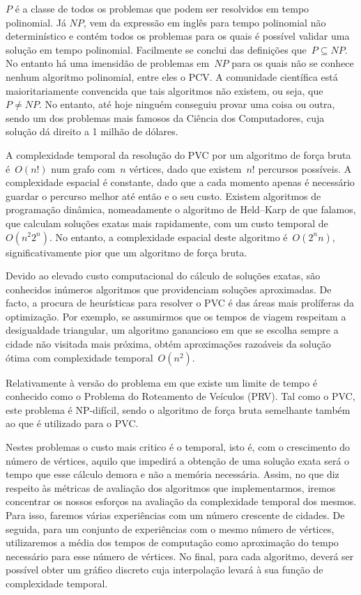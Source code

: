 \documentclass[12pt,a4paper,reqno]{report}
\numberwithin{figure}{section}
\numberwithin{equation}{section}
\begin{document}
$P$ é a classe de todos os problemas que podem ser resolvidos em tempo polinomial. Já $NP$, vem da expressão em inglês para tempo polinomial não determinístico e contém todos os problemas para os quais é possível validar uma solução em tempo polinomial. Facilmente se conclui das definições que~$P \subseteq NP$. No entanto há uma imensidão de problemas em~$NP$ para os quais não se conhece nenhum algoritmo polinomial, entre eles o PCV. A comunidade científica está maioritariamente convencida que tais algoritmos não existem, ou seja, que~$P \neq NP$. No entanto, até hoje ninguém conseguiu provar uma coisa ou outra, sendo um dos problemas mais famosos da Ciência dos Computadores, cuja solução dá direito a 1 milhão de dólares.

A complexidade temporal da resolução do PVC por um algoritmo de força bruta é~$O(n!)$ num grafo com~$n$ vértices, dado que existem~$n!$ percursos possíveis. A complexidade espacial é constante, dado que a cada momento apenas é necessário guardar o percurso melhor até então e o seu custo. Existem algoritmos de programação dinâmica, nomeadamente o algoritmo de Held–Karp de que falamos, que calculam soluções exatas mais rapidamente, com um custo temporal de~$O(n^2 2^n)$. No entanto, a complexidade espacial deste algoritmo é~$O(2^n n)$, significativamente pior que um algoritmo de força bruta.

Devido ao elevado custo computacional do cálculo de soluções exatas, são conhecidos inúmeros algoritmos que providenciam soluções aproximadas. De facto, a procura de heurísticas para resolver o PVC é das áreas mais prolíferas da optimização. Por exemplo, se assumirmos que os tempos de viagem respeitam a desigualdade triangular, um algoritmo ganancioso em que se escolha sempre a cidade não visitada mais próxima, obtém aproximações razoáveis da solução ótima com complexidade temporal~$O(n^2)$.

Relativamente à versão do problema em que existe um limite de tempo é conhecido como o Problema do Roteamento de Veículos (PRV). Tal como o PVC, este problema é NP-difícil, sendo o algoritmo de força bruta semelhante também ao que é utilizado para o PVC.

Nestes problemas o custo mais critico é o temporal, isto é, com o crescimento do número de vértices, aquilo que impedirá a obtenção de uma solução exata será o tempo que esse cálculo demora e não a memória necessária. Assim, no que diz respeito às métricas de avaliação dos algoritmos que implementarmos, iremos concentrar os nossos esforços na avaliação da complexidade temporal dos mesmos. Para isso, faremos várias experiências com um número crescente de cidades. De seguida, para um conjunto de experiências com o mesmo número de vértices, utilizaremos a média dos tempos de computação como aproximação do tempo necessário para esse número de vértices. No final, para cada algoritmo, deverá ser possível obter um gráfico discreto cuja interpolação levará à sua função de complexidade temporal.
\end{document}
